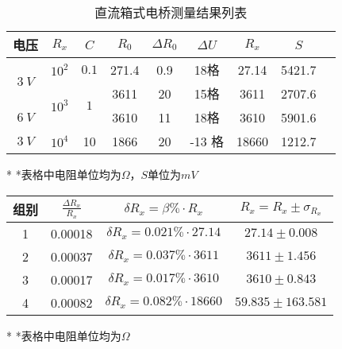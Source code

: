 \documentclass[UTF8]{ctexart}
\begin{document}
\begin{table}[H]
\centering
\caption{直流箱式电桥测量结果列表}
\begin{tabular}{|c|c|c|c|c|c|c|c|c|}
\hline
 电压     &   $R_x$  &  $C$   &  $R_0$   &  $ \Delta R_0$   &   $\Delta U$  &  $R_x$  &   $S$  \\
\hline
 \multirow{2}{*}{$3 \ V$}  &  $10^2$ &  $0.1$ &  271.4 &  0.9    &  18格 & 27.14 & 5421.7    \\ \cline{2-8} 

 &  \multirow{2}{*}{$10^3$} &  \multirow{2}{*}{$1$} &   3611  &  20  &  15格 & 3611 & 2707.6  \\ \cline{1-1}  \cline{4-8}

 $6 \ V$ &    &   &   3610  &  11  &  18格  &  3610 & 5901.6 \\ \cline{1-8}

$3 \ V$  &  $10^4$  & 10  &  1866   &  20   &  -13 格  & 18660  & 1212.7  \\ \cline{1-8}
\hline
\end{tabular}
\begin{tablenotes}
\centering
    \footnotesize
    \item[*] *表格中电阻单位均为$\Omega$，$S$单位为$mV$
\end{tablenotes}
\end{table}

\begin{table}[H]
    \centering
    \begin{tabular}{|c|c|c|c|}
    \hline
       组别  & $\frac{\Delta R_x}{R_x}$  &  $\delta R_x = \beta\% \cdot R_x$ & $R_x = R_x \pm \sigma_{R_x}$  \\
    \hline
        1 & 0.00018 & $\delta R_x = 0.021\% \cdot 27.14$  & $27.14 \pm 0.008$ \\
    \hline
        2 &  0.00037 &  $\delta R_x = 0.037\% \cdot 3611$ & $3611 \pm 1.456$ \\
    \hline
        3 &  0.00017  &  $\delta R_x = 0.017\% \cdot 3610$& $3610 \pm 0.843$ \\
    \hline
        4 &  0.00082  & $\delta R_x = 0.082\% \cdot 18660$ & $59.835\pm 163.581$\\
    \hline
    \end{tabular}
    \begin{tablenotes}
\centering
    \footnotesize
    \item[*] *表格中电阻单位均为$\Omega$
\end{tablenotes}
\end{table}
\end{document}
